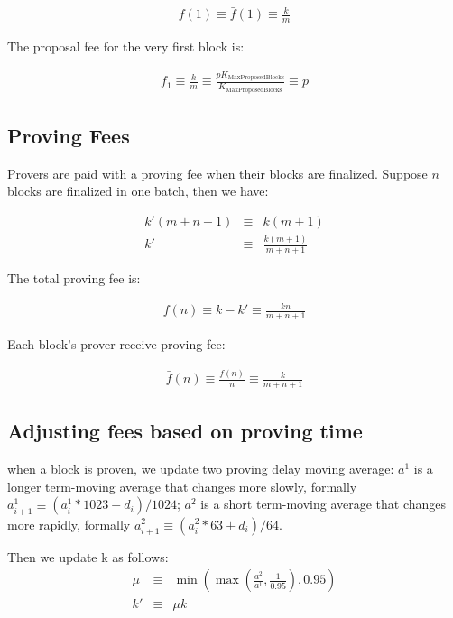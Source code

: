 \documentclass[9pt,oneside]{amsart}
\begin{document}
\begin{multicols}{2}
\begin{eqnarray}
f(1)  \equiv \bar{f}(1)  \equiv \frac{k}{m}
\end{eqnarray}



The proposal fee for the very first block is:



\begin{eqnarray}
f_1  \equiv \frac{k}{m}  \equiv \frac{pK_{\mathrm{MaxProposedBlocks}}}{K_{\mathrm{MaxProposedBlocks}}} \equiv p
\end{eqnarray}


\subsection{Proving Fees}

Provers are paid with a proving fee when their blocks are finalized. Suppose $n$ blocks are finalized in one batch, then we have:

\begin{eqnarray}
k'  (m+n+1) & \equiv  & k(m+1) \\
\nonumber k'  & \equiv & \frac{k(m+1)}{m+n+1} 
\end{eqnarray}



The total proving fee is:

\begin{eqnarray}
f(n)  \equiv  k - k'  \equiv \frac{kn}{m+n+1} 
\end{eqnarray}


Each block's prover receive proving fee:


\begin{eqnarray}
\bar{f}(n)  \equiv \frac{f(n)}{n}  \equiv \frac{k}{m+n+1} 
\end{eqnarray}

\subsection{Adjusting fees based on proving time}
when a block is proven, we update two proving delay moving average:  $a^1$ is a longer term-moving average that changes more slowly, formally
$a^1_{i+1} \equiv (a^1_{i} * 1023 + d_i)/1024$;  $a^2$ is a short term-moving average that changes more rapidly, formally
$a^2_{i+1} \equiv (a^2_{i} * 63 + d_i)/64$.

Then we update k as follows:
\begin{eqnarray}
\mu & \equiv & \min(\max( \frac{a^2}{a^1}, \frac{1}{0.95}), 0.95) \\
k' & \equiv  & \mu k  
\end{eqnarray}


\end{multicols}
\end{document}
